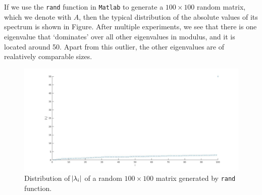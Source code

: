 \documentclass[11pt]{article}
\begin{document}
\maketitle
\section{}
If we use the \texttt{rand} function in \texttt{Matlab} to generate a $100\times100$ random matrix, which we denote with $A$, then the typical distribution of the absolute values of its spectrum is shown in Figure. After multiple experiments, we see that there is one eigenvalue that `dominates' over all other eigenvalues in modulus, and it is located around 50. Apart from this outlier, the other eigenvalues are of realatively comparable sizes.\\[0.3cm]

\begin{center}
\begin{figure}[h]
\centering
\includegraphics[width=14cm]{matlab/prob1a_uniform.jpg}
\caption{Distribution of $\abs{\lambda_i}$ of a random $100\times100$ matrix generated by \texttt{rand} function.}
\end{figure}
\end{center}
\end{document}

